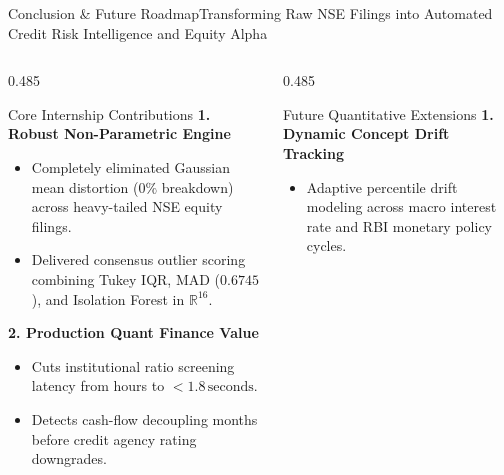 \begin{frame}{Conclusion \& Future Roadmap}{Transforming Raw NSE Filings into Automated Credit Risk Intelligence and Equity Alpha}
    \vspace{-0.2cm}
    \begin{columns}[T]
        \begin{column}{0.485\textwidth}
            \begin{quantcard}[height=4.2cm]{Core Internship Contributions}
                \fontsize{6.3pt}{8.1pt}\selectfont
                \textbf{\color{deepemerald}1. Robust Non-Parametric Engine}
                \begin{itemize}
                    \setlength{\itemsep}{1.5pt}
                    \item Completely eliminated Gaussian mean distortion ($0\%$ breakdown) across heavy-tailed NSE equity filings.
                    \item Delivered consensus outlier scoring combining Tukey IQR, MAD ($0.6745$), and Isolation Forest in $\mathbb{R}^{16}$.
                \end{itemize}

                \vspace{2pt}
                \textbf{\color{deepemerald}2. Production Quant Finance Value}
                \begin{itemize}
                    \setlength{\itemsep}{1.5pt}
                    \item Cuts institutional ratio screening latency from hours to $< 1.8\,\text{seconds}$.
                    \item Detects cash-flow decoupling months before credit agency rating downgrades.
                \end{itemize}
                \vfill
            \end{quantcard}
        \end{column}

        \begin{column}{0.485\textwidth}
            \begin{quantcard}[height=4.2cm]{Future Quantitative Extensions}
                \fontsize{6.3pt}{8.1pt}\selectfont
                \textbf{\color{deepemerald}1. Dynamic Concept Drift Tracking}
                \begin{itemize}
                    \setlength{\itemsep}{1.5pt}
                    \item Adaptive percentile drift modeling across macro interest rate and RBI monetary policy cycles.
                \end{itemize}


\end{quantcard}
\end{column}
\end{columns}
\end{frame}
